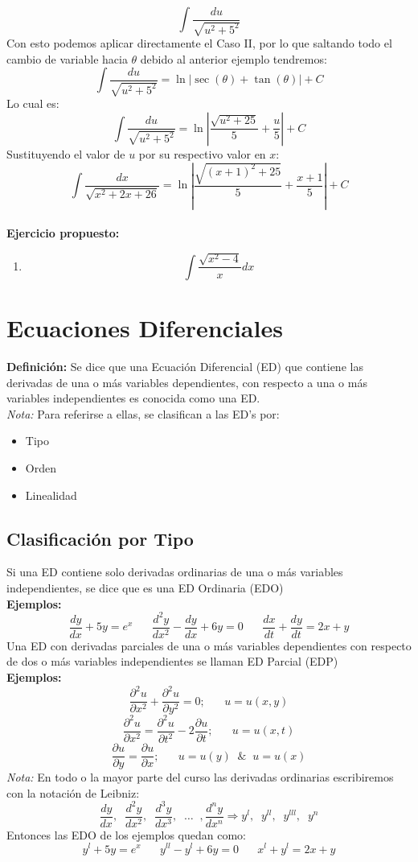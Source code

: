 \documentclass[10pt,executivepaper]{article}
\begin{document}
\[\int \frac{du}{\sqrt{u^{2}+5^{2}}}\]
Con esto podemos aplicar directamente el Caso II, por lo que saltando todo el cambio de variable hacia $\theta$ debido al anterior ejemplo tendremos:
\[\int \frac{du}{\sqrt{u^{2}+5^{2}}}=\ln\left|\sec(\theta)+\tan(\theta)\right|+C\]
Lo cual es:
\[\int \frac{du}{\sqrt{u^{2}+5^{2}}}=\ln\left|\frac{\sqrt{u^{2}+25}}{5}+\frac{u}{5}\right|+C\]
Sustituyendo el valor de $u$ por su respectivo valor en $x$:
\[\int\frac{dx}{\sqrt{x^{2}+2x+26}}=\ln\left|\frac{{\sqrt{(x+1)^2+25}}}{5}+\frac{x+1}{5}\right|+C\]
\\\vspace{0.5cm}
\textbf{Ejercicio propuesto:}
\begin{enumerate}
  \item \[\int\frac{\sqrt{x^{2}-4}}{x}dx\]
\end{enumerate}
\clearpage

\section{Ecuaciones Diferenciales}
\textbf{Definición:} Se dice que una Ecuación Diferencial (ED) que contiene las derivadas de una o más variables dependientes, con respecto a una o más variables independientes es conocida como una ED.\\
\textit{Nota:} Para referirse a ellas, se clasifican a las ED's por:
\begin{itemize}
  \item Tipo
  \item Orden
  \item Linealidad
\end{itemize}
\subsection{Clasificación por Tipo}
Si una ED contiene solo derivadas ordinarias de una o más variables independientes, se dice que es una ED Ordinaria (EDO)
\\\textbf{Ejemplos:}
\[\frac{dy}{dx}+5y=e^{x}\;\;\;\;\;\;\frac{d^{2}y}{dx^{2}}-\frac{dy}{dx}+6y=0 \;\;\;\;\;\;\frac{dx}{dt}+\frac{dy}{dt}=2x+y\]
Una ED con derivadas parciales de una o más variables dependientes con respecto de dos o más variables independientes se llaman ED Parcial (EDP)
\\\textbf{Ejemplos:}\\
\[\frac{\partial^{2}u}{\partial x^{2}}+\frac{\partial^{2}u}{\partial y^{2}}=0;\;\;\;\;\;\; u=u(x,y)\]
\[\frac{\partial^{2}u}{\partial x^{2}}=\frac{\partial^{2}u}{\partial t^{2}}-2\frac{\partial u}{\partial t};\;\;\;\;\;\; u=u(x,t)\]
\[\frac{\partial u}{\partial y}=\frac{\partial u}{\partial x}; \;\;\;\;\;\; u=u(y)\;\;\&\;\;u=u(x)\]
\textit{Nota:} En todo o la mayor parte del curso las derivadas ordinarias escribiremos con la notación de Leibniz:
\[\frac{dy}{dx},\;\;\frac{d^{2}y}{dx^{2}},\;\;\frac{d^{3}y}{dx^{3}},\;\;\ldots\;\;,\frac{d^{n}y}{dx^{n}} \Rightarrow y^{l},\;\;y^{ll},\;\;y^{lll},\;\;y^{n}\]
Entonces las EDO de los ejemplos quedan como:
\[y^{l}+5y=e^{x}\;\;\;\;\;\;y^{ll}-y^{l}+6y=0\;\;\;\;\;\;x^{l}+y^{l}=2x+y\]
\clearpage
\end{document}
